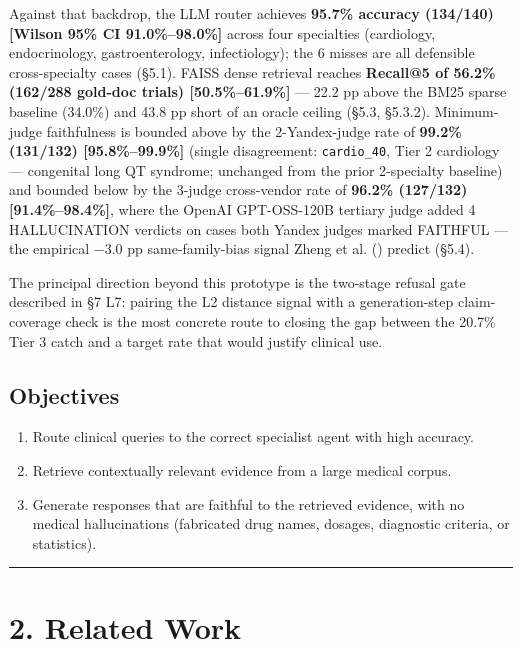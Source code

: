 \documentclass[
  american,
  a4paper,
]{article}
\providecommand{\tightlist}{%
  \setlength{\itemsep}{0pt}\setlength{\parskip}{0pt}}
\begin{document}
Against that backdrop, the LLM router achieves \textbf{95.7\% accuracy
(134/140) {[}Wilson 95\% CI 91.0\%--98.0\%{]}} across four specialties
(cardiology, endocrinology, gastroenterology, infectiology); the 6
misses are all defensible cross-specialty cases (§5.1). FAISS dense
retrieval reaches \textbf{Recall@5 of 56.2\% (162/288 gold-doc trials)
{[}50.5\%--61.9\%{]}} --- 22.2 pp above the BM25 sparse baseline
(34.0\%) and 43.8 pp short of an oracle ceiling (§5.3, §5.3.2).
Minimum-judge faithfulness is bounded above by the 2-Yandex-judge rate
of \textbf{99.2\% (131/132) {[}95.8\%--99.9\%{]}} (single disagreement:
\texttt{cardio\_40}, Tier 2 cardiology --- congenital long QT syndrome;
unchanged from the prior 2-specialty baseline) and bounded below by the
3-judge cross-vendor rate of \textbf{96.2\% (127/132)
{[}91.4\%--98.4\%{]}}, where the OpenAI GPT-OSS-120B tertiary judge
added 4 HALLUCINATION verdicts on cases both Yandex judges marked
FAITHFUL --- the empirical −3.0 pp same-family-bias signal Zheng et al.
() predict (§5.4).

The principal direction beyond this prototype is the two-stage refusal
gate described in §7 L7: pairing the L2 distance signal with a
generation-step claim-coverage check is the most concrete route to
closing the gap between the 20.7\% Tier 3 catch and a target rate that
would justify clinical use.

\subsection{Objectives}\label{objectives}

\begin{enumerate}
\def\labelenumi{\arabic{enumi}.}
\tightlist
\item
  Route clinical queries to the correct specialist agent with high
  accuracy.
\item
  Retrieve contextually relevant evidence from a large medical corpus.
\item
  Generate responses that are faithful to the retrieved evidence, with
  no medical hallucinations (fabricated drug names, dosages, diagnostic
  criteria, or statistics).
\end{enumerate}

\begin{center}\rule{0.5\linewidth}{0.5pt}\end{center}

\section{2. Related Work}\label{related-work}
\end{document}
